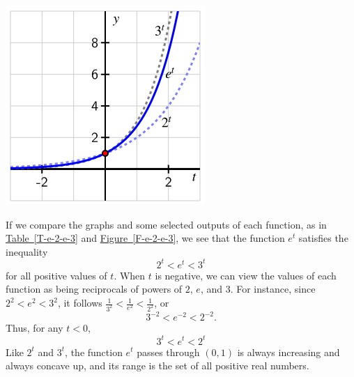 \documentclass[nooutcomes]{ximera}
\begin{document}
\begin{image}
\includegraphics{ExpText13}
\end{image}

If we compare the graphs and some selected outputs of each function, as in \hyperref[T-e-2-e-3]{Table~\ref{T-e-2-e-3}} and \hyperref[F-e-2-e-3]{Figure~\ref{F-e-2-e-3}}, we see that the function \(e^t\) satisfies the inequality%
\begin{equation*}
2^t \lt e^t \lt 3^t
\end{equation*}
for all positive values of \(t\).  When \(t\) is negative, we can view the values of each function as being reciprocals of powers of \(2\), \(e\), and \(3\).  For instance, since \(2^2 \lt e^2 \lt 3^2\), it follows \(\frac{1}{3^2} \lt \frac{1}{e^2} \lt \frac{1}{2^2}\), or%
\begin{equation*}
3^{-2} \lt e^{-2} \lt 2^{-2}\text{.}
\end{equation*}
Thus, for any \(t \lt 0\),%
\begin{equation*}
3^t \lt e^t \lt 2^t
\end{equation*}
Like \(2^t\) and \(3^t\), the function \(e^t\) passes through \((0,1)\) is always increasing and always concave up, and its range is the set of all positive real numbers.
\end{document}
